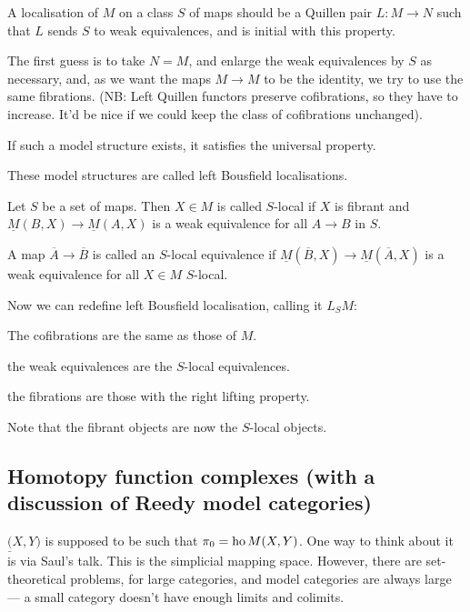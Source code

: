 \begin{AlexandreBousfieldLocalisation}
\begin{defn*}
A localisation of $M$ on a class $S$ of maps should be a Quillen pair $L:M\to N$ such that $L$ sends $S$ to weak equivalences, and is initial with this property.
\end{defn*}
The first guess is to take $N=M$, and enlarge the weak equivalences by $S$ as necessary,  and, as we want the maps $M\to M$ to be the identity, we try to use the same fibrations. (NB: Left Quillen functors preserve cofibrations, so they have to increase. It'd be nice if we could keep the class of cofibrations unchanged).
\begin{prop*}
If such a model structure exists, it satisfies the universal property.
\end{prop*}
\begin{defn*}
These model structures are called left Bousfield localisations.
\end{defn*}
\begin{defn*}
Let $S$ be a set of maps. Then $X\in M$ is called $S$-local if $X$ is fibrant and $\underline M(B,X)\to\underline M(A,X)$ is a weak equivalence for all $A\to B$ in $S$.
\end{defn*}
\begin{defn*}
A map $\overline A\to\overline B$ is called an $S$-local equivalence if $\underline M(\overline B,X)\to\underline M(\overline A,X)$ is a weak equivalence for all $X\in M$ $S$-local.
\end{defn*}
Now we can redefine left Bousfield localisation, calling it $L_SM$:
\begin{itemise}
\item The cofibrations are the same as those of $M$.
\item the weak equivalences are the $S$-local equivalences.
\item the fibrations are those with the right lifting property.
\item Note that the fibrant objects are now the $S$-local objects.
\end{itemise}
\subsection*{Homotopy function complexes (with a discussion of Reedy model categories)}
$\underline(X,Y)$ is supposed to be such that $\pi_0=\textup{ho}\,M(X,Y)$. One way to think about it is via Saul's talk. This is the simplicial mapping space. However, there are set-theoretical problems, for large categories, and model categories are always large --- a small category doesn't have enough limits and colimits.


\end{AlexandreBousfieldLocalisation}

